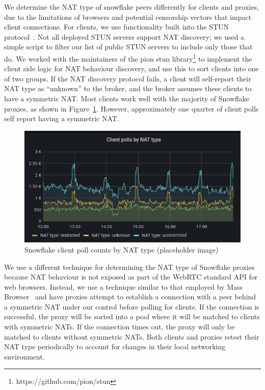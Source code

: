 \documentclass[letterpaper,twocolumn]{article}
\begin{document}
We determine the NAT type of snowflake peers differently for clients and proxies, due to the
limitations of browsers and potential censorship vectors that impact client connections.
For clients, we use functionality built into the STUN protocol~\cite{rfc5780}. Not all deployed STUN
servers support NAT discovery; we used a simple script to filter our list of public STUN servers
to include only those that do. We worked with the maintainers of
the pion stun library\footnote{https://github.com/pion/stun} to implement the client side logic
for NAT behaviour discovery, and use this to sort clients into one of two groups.
If the NAT discovery protocol fails, a client will self-report their NAT
type as ``unknown'' to the broker, and the broker assumes these clients to have a symmetric NAT.
Most clients work well with the majority of Snowflake proxies, as
shown in Figure~\ref{fig:clients-by-nat}. However, approximately one quarter of client polls self
report having a symmetric NAT.

\begin{figure}
\centering
    \includegraphics[width=\columnwidth]{figures/clients-by-nat}
    \caption{Snowflake client poll counts by NAT type (placeholder image)}
    \label{fig:clients-by-nat}
\end{figure}

We use a different technique for determining the NAT type of Snowflake proxies because
NAT behaviour is not exposed as part of the WebRTC standard API for web browsers.
Instead, we use a technique similar to that employed by Mass Browser~\cite{Nasr2020a}
and have proxies attempt to establish a connection with a peer behind a symmetric NAT under our
control before polling for clients. If the connection is successful, the proxy will be sorted into
a pool where it will be matched to clients with symmetric NATs. If the connection times out,
the proxy will only be matched to clients without symmetric NATs. Both clients and proxies
retest their NAT type periodically to account for changes in their local networking
environment.
\end{document}
